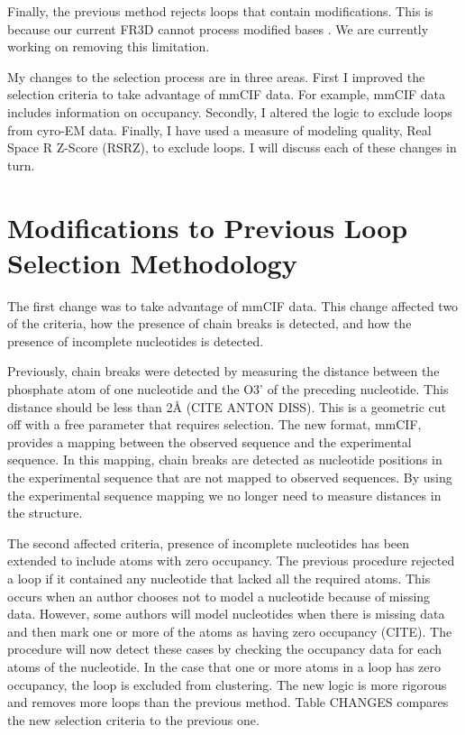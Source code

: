 Finally, the previous method rejects loops that contain modifications. This is
because our current FR3D cannot process modified bases \cite{Sarver2008a}. We are
currently working on removing this limitation.

My changes to the selection process are in three areas. First I improved the
selection criteria to take advantage of mmCIF data. For example, mmCIF data
includes information on occupancy. Secondly, I altered the logic to exclude
loops from cyro-EM data. Finally, I have used a measure of modeling quality,
Real Space R Z-Score (RSRZ), to exclude loops. I will discuss each of these
changes in turn.

\section{Modifications to Previous Loop Selection Methodology}

The first change was to take advantage of mmCIF data. This change affected two
of the criteria, how the presence of chain breaks is detected, and how the
presence of incomplete nucleotides is detected. 

Previously, chain breaks were detected by measuring the distance between the
phosphate atom of one nucleotide and the O3’ of the preceding nucleotide. This
distance should be less than 2Å (CITE ANTON DISS). This is a geometric cut off
with a free parameter that requires selection. The new format, mmCIF, provides a
mapping between the observed sequence and the experimental sequence. In this
mapping, chain breaks are detected as nucleotide  positions in the experimental
sequence that are not mapped to observed sequences. By using the experimental
sequence mapping we no longer need to measure distances in the structure. 

The second affected criteria, presence of incomplete nucleotides has been
extended to include atoms with zero occupancy. The previous procedure rejected a
loop if it contained any nucleotide that lacked all the required atoms. This
occurs when an author chooses not to model a nucleotide because of missing data.
However, some authors will model nucleotides when there is missing data and then
mark one or more of the atoms as having zero occupancy (CITE). The procedure
will now detect these cases by checking the occupancy data for each atoms of the
nucleotide. In the case that one or more atoms in a loop has zero occupancy, the
loop is excluded from clustering. The new logic is more rigorous and removes
more loops than the previous method. Table CHANGES compares the new selection
criteria to the previous one.

